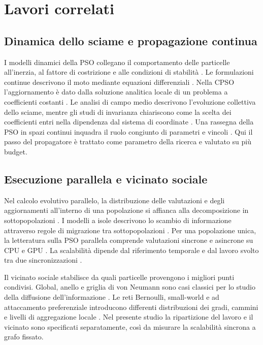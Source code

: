\section{Lavori correlati}
\label{sec:related-work}

\subsection{Dinamica dello sciame e propagazione continua}
I modelli dinamici della PSO collegano il comportamento delle particelle all'inerzia, al fattore di costrizione e alle condizioni di stabilità \citep{ShiEberhart1998,Clerc2002,FernandezMartinezGarciaGonzalo2009,FernandezMartinezGarciaGonzalo2011}. Le formulazioni continue descrivono il moto mediante equazioni differenziali \citep{Emara2004,FernandezMartinezGarciaGonzalo2008}. Nella CPSO l'aggiornamento è dato dalla soluzione analitica locale di un problema a coefficienti costanti \citep{orlando2020analytic}. Le analisi di campo medio descrivono l'evoluzione collettiva dello sciame, mentre gli studi di invarianza chiariscono come la scelta dei coefficienti entri nella dipendenza dal sistema di coordinate \citep{GrassiPareschi2021,Wilke2007Invariance}. Una rassegna della PSO in spazi continui inquadra il ruolo congiunto di parametri e vincoli \citep{BonyadiMichalewicz2017}. Qui il passo del propagatore è trattato come parametro della ricerca e valutato su più budget.

\subsection{Esecuzione parallela e vicinato sociale}
Nel calcolo evolutivo parallelo, la distribuzione delle valutazioni e degli aggiornamenti all'interno di una popolazione si affianca alla decomposizione in sottopopolazioni \citep{Alba2002,CantuPaz2001}. I modelli a isole descrivono lo scambio di informazione attraverso regole di migrazione tra sottopopolazioni \citep{VanneschiCodecasaMauri2011,DaSilveiraEtAl2023PIM}. Per una popolazione unica, la letteratura sulla PSO parallela comprende valutazioni sincrone e asincrone su CPU e GPU \citep{Schutte2004,Koh2006,Mussi2011,Lalwani2019}. La scalabilità dipende dal riferimento temporale e dal lavoro svolto tra due sincronizzazioni \citep{HoeflerBelli2015}.

Il vicinato sociale stabilisce da quali particelle provengono i migliori punti condivisi. Global, anello e griglia di von Neumann sono casi classici per lo studio della diffusione dell'informazione \citep{Kennedy1999Topology,KennedyMendes2002}. Le reti Bernoulli, small-world e ad attaccamento preferenziale introducono differenti distribuzioni dei gradi, cammini e livelli di aggregazione locale \citep{ErdosRenyi1959,WattsStrogatz1998,BarabasiAlbert1999}. Nel presente studio la ripartizione del lavoro e il vicinato sono specificati separatamente, così da misurare la scalabilità sincrona a grafo fissato.

